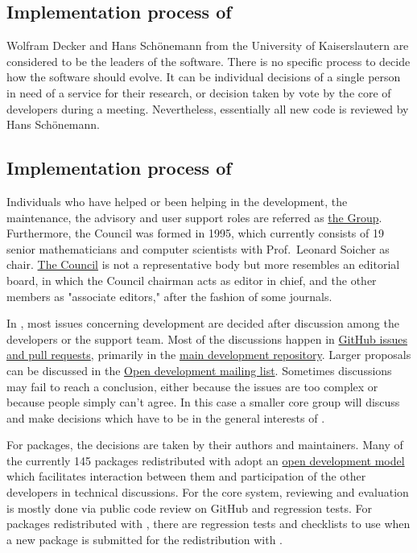 \documentclass{deliverablereport}
\begin{document}
\subsection{Implementation process of \Singular}

Wolfram Decker and Hans Schönemann from the University of Kaiserslautern are considered to be the leaders of the \Singular software.
There is no specific process to decide how the software should evolve. It can be individual decisions of a single person in need of a service for their research, or decision taken by vote by the core of \Singular developers during a meeting.
Nevertheless, essentially all new code is reviewed by Hans Schönemann.

\subsection{Implementation process of \GAP}

Individuals who have helped or been helping in the development, the
maintenance, the advisory and user support roles are referred as
\href{https://www.gap-system.org/Contacts/People/people.html}{the \GAP
  Group}.  Furthermore, the \GAP Council was formed in 1995, which
currently consists of 19 senior mathematicians and computer
scientists with Prof.~Leonard Soicher as
chair. \href{https://www.gap-system.org/Contacts/People/Council/council.html}{The
  \GAP Council} is not a representative body but more resembles an
editorial board, in which the Council chairman acts as editor in
chief, and the other members as "associate editors," after
the fashion of some journals.

In \GAP, most issues concerning development are decided after
discussion among the developers or the support team. Most of the
discussions happen in \href{https://github.com/gap-system}{GitHub
  issues and pull requests}, primarily in the
\href{https://github.com/gap-system/gap}{main development repository}.
Larger proposals can be discussed in the
\href{http://mail.gap-system.org/mailman/listinfo/gap}{Open \GAP
  development mailing list}. Sometimes discussions may fail to reach a
conclusion, either because the issues are too complex or because
people simply can’t agree. In this case a smaller core group will
discuss and make decisions which have to be in the general interests
of \GAP.

For \GAP packages, the decisions are taken by their authors and
maintainers. Many of the currently 145 packages redistributed with \GAP
adopt an \href{http://gap-packages.github.io/}{open development model}
which facilitates interaction between them and participation of the
other \GAP developers in technical discussions.  For the
core \GAP system, reviewing and evaluation is mostly done via public
code review on GitHub and regression tests. For \GAP packages
redistributed with \GAP, there are regression tests and checklists to
use when a new package is submitted for the redistribution with \GAP.
\end{document}
